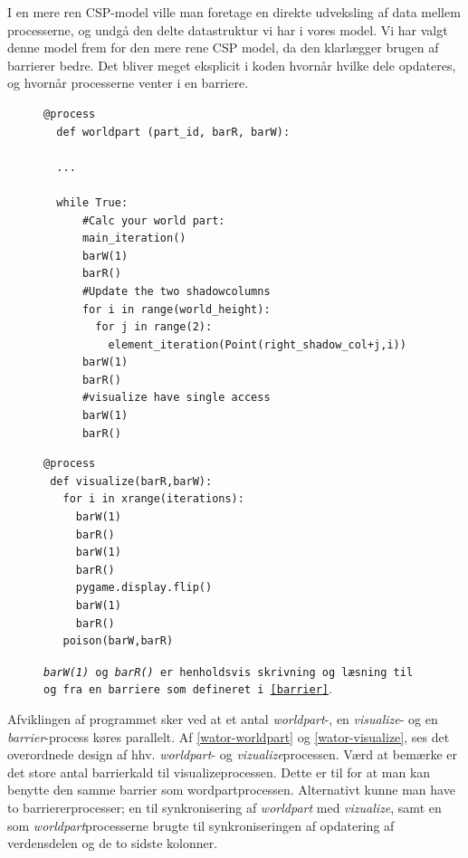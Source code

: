 I en mere ren CSP-model ville man foretage en direkte udveksling af data mellem 
processerne, og undgå den delte datastruktur vi har i vores model.  Vi har 
valgt denne model frem for den mere rene CSP model, da den klarlægger brugen af 
barrierer bedre.  Det bliver meget eksplicit i koden hvornår hvilke dele 
opdateres, og hvornår processerne venter i en barriere.

\begin{figure}[hbtp]
\begin{minipage}{\linewidth}
\begin{lstlisting}[label=wator-worldpart,caption=Uddrag af processen 
  \emph{worldpart} i Wator]
  @process
  def worldpart (part_id, barR, barW):
  
  ...
  
  while True:
      #Calc your world part:
      main_iteration()
      barW(1)
      barR()
      #Update the two shadowcolumns
      for i in range(world_height):
        for j in range(2):
          element_iteration(Point(right_shadow_col+j,i))
      barW(1)
      barR()
      #visualize have single access
      barW(1)
      barR()
\end{lstlisting}

\begin{lstlisting}[label=wator-visualize,caption=Processen \emph{visualize} i 
  Wator]
@process
 def visualize(barR,barW):
   for i in xrange(iterations):
     barW(1)
     barR()
     barW(1)
     barR()
     pygame.display.flip()
     barW(1)
     barR()
   poison(barW,barR)
\end{lstlisting}

\texttt{\emph{barW(1)} og \emph{barR()} er henholdsvis skrivning og læsning til og 
fra en barriere som defineret i \cref{barrier}}. 
\vspace{1cm}
\end{minipage}
\end{figure}
Afviklingen af programmet sker ved at et antal \emph{worldpart}-, en 
\emph{visualize}- og en \emph{barrier}-process køres parallelt. Af 
 \autoref{wator-worldpart} og \vref{wator-visualize}, ses det overordnede design af hhv. \emph{worldpart}- og \emph{vizualize}processen.  Værd at bemærke er det store antal barrierkald til visualizeprocessen. Dette er til for at man kan benytte den samme barrier som wordpartprocessen. Alternativt kunne man have to barriererprocesser; en til synkronisering af \emph{worldpart} med \emph{vizualize}, samt en som \emph{worldpart}processerne brugte til synkroniseringen af opdatering af verdensdelen og de to sidste kolonner. 

